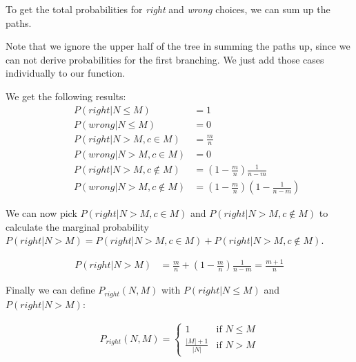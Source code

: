 \documentclass{article}
\begin{document}

To get the total probabilities for \textit{right} and \textit{wrong} choices, we 
can sum up the paths.

Note that we ignore the upper half of the tree in summing the paths up, since we 
can not derive probabilities for the first branching. We just add those cases 
individually to our function.

We get the following results:
\begin{align*}
&&P(right | N \leq M) &= 1 \\
&&P(wrong | N \leq M) &= 0 \\
&&P(right | N > M, c \in M) &= \frac{m}{n} \\
&&P(wrong | N > M, c \in M) &= 0 \\
&&P(right | N > M, c \notin M) &= \left(1 - \frac{m}{n}\right) \frac{1}{n-m} \\
&&P(wrong | N > M, c \notin M) &= \left(1 - \frac{m}{n}\right) \left(1 - \frac{1}{n-m}\right)
\end{align*}

We can now pick $P(right | N > M, c \in M)$ and $P(right | N > M, c \notin M)$ to 
calculate the marginal probability $P(right | N > M) = P(right | N > M, c \in M) + P(right | N > M, c \notin M)$.

\begin{align}
P(right | N > M) &= \frac{m}{n} + (1 - \frac{m}{n}) \frac{1}{n - m} = \frac{m + 1}{n}
\end{align}

Finally we can define $P_{right}(N, M)$ with $P(right | N \leq M)$ and $P(right | N > M)$:

\begin{align*}
P_{right}(N, M) = 
\begin{cases} 
1             & \mbox{if } N \leq M \\ 
\frac{|M|+1}{|N|} & \mbox{if } N > M
\end{cases}
\end{align*}
\end{document}
